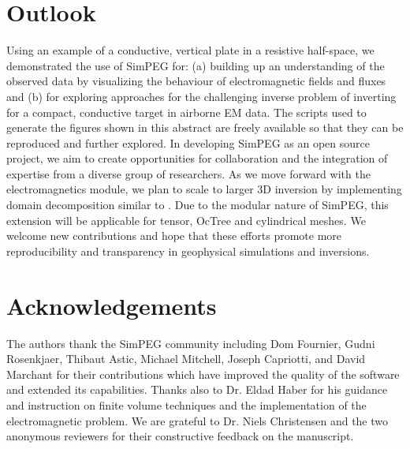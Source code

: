 \documentclass[paper]{geophysics}
\begin{document}
\section{Outlook}
Using an example of a conductive, vertical plate in a resistive half-space, we demonstrated the use of SimPEG for: (a) building up an understanding of the observed data by visualizing the behaviour of electromagnetic fields and fluxes and (b) for exploring approaches for the challenging inverse problem of inverting for a compact, conductive target in airborne EM data. The scripts used to generate the figures shown in this abstract are freely available so that they can be reproduced and further explored. In developing SimPEG as an open source project, we aim to create opportunities for collaboration and the integration of expertise from a diverse group of researchers. As we move forward with the electromagnetics module, we plan to scale to larger 3D inversion by implementing domain decomposition similar to \cite{yang2014}. Due to the modular nature of SimPEG, this extension will be applicable for tensor, OcTree and cylindrical meshes. We welcome new contributions and hope that these efforts promote more reproducibility and transparency in geophysical simulations and inversions.

\section{Acknowledgements}
The authors thank the SimPEG community including Dom Fournier, Gudni Rosenkjaer, Thibaut Astic, Michael Mitchell, Joseph Capriotti, and David Marchant for their contributions which have improved the quality of the software and extended its capabilities. Thanks also to Dr. Eldad Haber for his guidance and instruction on finite volume techniques and the implementation of the electromagnetic problem. We are grateful to Dr. Niels Christensen and the two anonymous reviewers for their constructive feedback on the manuscript.


\clearpage

\end{document}
